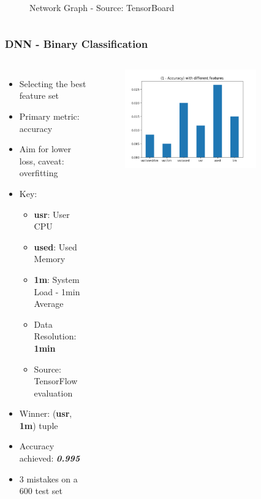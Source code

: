\documentclass[aspectratio=169,11pt,hyperref={colorlinks=true}]{beamer}
\begin{document}
\begin{frame}
\begin{columns}
\begin{figure}
\begin{center}
             \caption{Network Graph - Source: TensorBoard}
        \end{center}
        \end{figure}
    \end{columns}
\end{frame}

\begin{frame}
    \frametitle{DNN - Binary Classification}
    \begin{columns}
        \begin{itemize}
            \item{Selecting the best feature set}
            \item{Primary metric: accuracy}
            \item{Aim for lower loss, caveat: overfitting}
            \item{Key:}
            \begin{itemize}
              \item{\textbf{usr}: User CPU}
              \item{\textbf{used}: Used Memory}
              \item{\textbf{1m}: System Load - 1min Average}
              \item{Data Resolution: \textbf{1min}}
              \item{Source: TensorFlow evaluation}
            \end{itemize}
            \item{Winner: (\textbf{usr}, \textbf{1m}) tuple}
            \item{Accuracy achieved: \emph{\textbf{0.995}}}
            \item{3 mistakes on a 600 test set}
        \end{itemize}
        \begin{center}
        \begin{figure}
          \includegraphics[width=0.8\textwidth,height=0.4\textheight]{graphs/accuracy_by_feature-status.png}

\end{figure}
\end{center}
\end{columns}
\end{frame}
\end{document}

